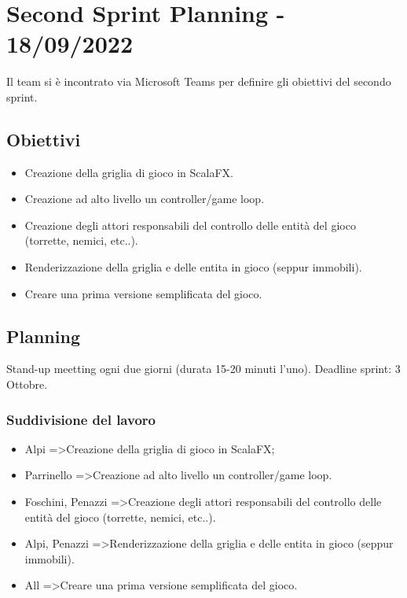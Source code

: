 \section{Second Sprint Planning - 18/09/2022}
Il team si è incontrato via Microsoft Teams per definire gli obiettivi del secondo sprint.

\subsection{Obiettivi}
\begin{itemize}
  \item Creazione della griglia di gioco in ScalaFX.
  \item Creazione ad alto livello un controller/game loop.
  \item Creazione degli attori responsabili del controllo delle entità del gioco (torrette, nemici, etc..).
  \item Renderizzazione della griglia e delle entita in gioco (seppur immobili).
  \item Creare una prima versione semplificata del gioco.
\end{itemize}

\subsection{Planning}
Stand-up meetting ogni due giorni (durata 15-20 minuti l'uno).
Deadline sprint: 3 Ottobre.

\subsubsection{Suddivisione del lavoro}
\begin{itemize}
  \item Alpi =\textgreater  Creazione della griglia di gioco in ScalaFX;
  \item Parrinello =\textgreater  Creazione ad alto livello un controller/game loop.
  \item Foschini, Penazzi =\textgreater  Creazione degli attori responsabili del controllo delle entità del gioco (torrette, nemici, etc..).
  \item Alpi, Penazzi =\textgreater  Renderizzazione della griglia e delle entita in gioco (seppur immobili).
  \item All =\textgreater  Creare una prima versione semplificata del gioco.
\end{itemize}

